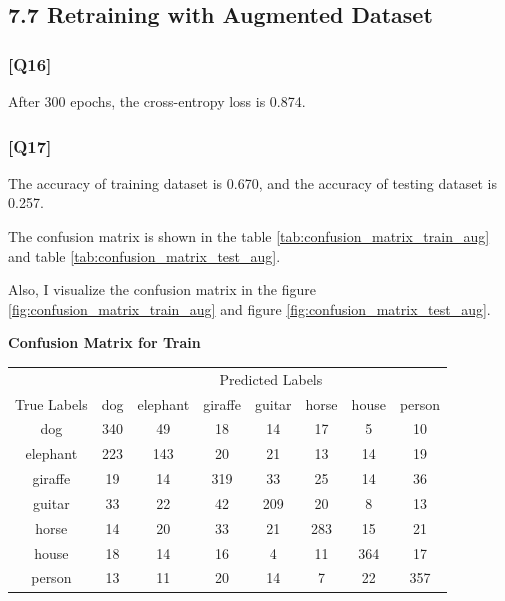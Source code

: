 \documentclass{article}
\begin{document}
\subsection*{7.7 Retraining with Augmented Dataset}

\subsubsection*{[Q16]}

After 300 epochs, the cross-entropy loss is 0.874.

\subsubsection*{[Q17]}
The accuracy of training dataset is 0.670, and the accuracy of testing dataset is 0.257.

The confusion matrix is shown in the table \ref{tab:confusion_matrix_train_aug} and table \ref{tab:confusion_matrix_test_aug}.

Also, I visualize the confusion matrix in the figure \ref{fig:confusion_matrix_train_aug} and figure \ref{fig:confusion_matrix_test_aug}.

\begin{center}
    \textbf{Confusion Matrix for Train}
    
    \begin{tabular}{c|ccccccc}
    \toprule
    & \multicolumn{7}{c}{Predicted Labels} \\
    \cmidrule(lr){2-8}
    True Labels & dog & elephant & giraffe & guitar & horse & house & person \\
    \midrule
    dog & 340 & 49 & 18 & 14 & 17 & 5 & 10 \\
    elephant & 223 & 143 & 20 & 21 & 13 & 14 & 19 \\
    giraffe & 19 & 14 & 319 & 33 & 25 & 14 & 36 \\
    guitar & 33 & 22 & 42 & 209 & 20 & 8 & 13 \\
    horse & 14 & 20 & 33 & 21 & 283 & 15 & 21 \\
    house & 18 & 14 & 16 & 4 & 11 & 364 & 17 \\
    person & 13 & 11 & 20 & 14 & 7 & 22 & 357 \\
    \bottomrule
    \end{tabular}
    \label{tab:confusion_matrix_train_aug}
\end{center}
\end{document}
